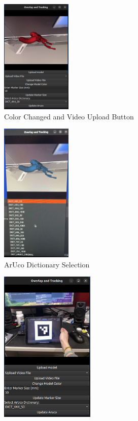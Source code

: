 \documentclass[12pt]{article}
\begin{document}
\begin{enumerate}
\begin{enumerate}
                        \begin{figure}[H]
                              \centering
                              \includegraphics[width=0.3\textwidth]{upload.png}
                              \caption{Color Changed and Video Upload Button}
                        \end{figure}
                        \begin{figure}[H]
                              \centering
                              \includegraphics[width=0.3\textwidth]{select_aruco.jpg}
                              \caption{ArUco Dictionary Selection}
                        \end{figure}
                        \begin{figure}[H]
                              \centering
                              \includegraphics[width=0.4\textwidth]{vedio.png}

\end{figure}
\end{enumerate}
\end{enumerate}
\end{document}
